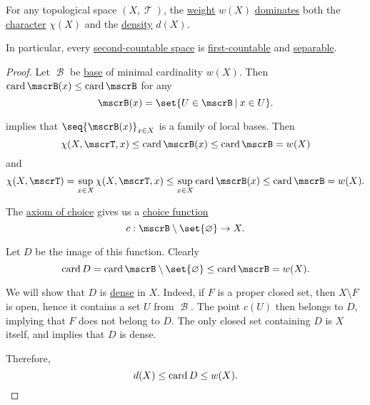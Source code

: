 \begin{proposition}\label{thm:topological_space_countability}
  For any topological space \( (X, \mscrT) \), the \hyperref[def:topological_space_weight]{weight} \( w(X) \) \hyperref[def:equinumerosity]{dominates} both the \hyperref[def:topological_space_character]{character} \( \chi(X) \) and the \hyperref[def:topological_space_density]{density} \( d(X) \).
\end{proposition}
\begin{comments}
  \item In particular, every \hyperref[def:topological_space_weight]{second-countable space} is \hyperref[def:topological_space_character]{first-countable} and \hyperref[def:topological_space_density]{separable}.
\end{comments}
\begin{proof}
   Let \( \mscrB \) be \hyperref[def:topological_base]{base} of minimal cardinality \( w(X) \). Then \( \card \mscrB(x) \leq \card \mscrB \) for any
  \begin{equation*}
    \mscrB(x) = \set{ U \in \mscrB \given x \in U }.
  \end{equation*}

   implies that \( \seq{ \mscrB(x) }_{x \in X} \) is a family of local bases. Then
  \begin{equation*}
    \chi(X, \mscrT, x) \leq \card \mscrB(x) \leq \card \mscrB = w(X)
  \end{equation*}
  and
  \begin{equation*}
    \chi(X, \mscrT) = \sup_{x \in X} \chi(X, \mscrT, x) \leq \sup_{x \in X} \card \mscrB(x) \leq \card \mscrB = w(X).
  \end{equation*}

   The \hyperref[def:zfc/choice]{axiom of choice} gives us a \hyperref[def:choice_function]{choice function}
  \begin{equation*}
    c: \mscrB \setminus \set{ \varnothing } \to X.
  \end{equation*}

  Let \( D \) be the image of this function. Clearly
  \begin{equation*}
    \card D = \card \mscrB \setminus \set{ \varnothing } \leq \card \mscrB = w(X).
  \end{equation*}

  We will show that \( D \) is \hyperref[def:topologically_dense_set]{dense} in \( X \). Indeed, if \( F \) is a proper closed set, then \( X \setminus F \) is open, hence it contains a set \( U \) from \( \mscrB \). The point \( c(U) \) then belongs to \( D \), implying that \( F \) does not belong to \( D \). The only closed set containing \( D \) is \( X \) itself, and  implies that \( D \) is dense.

  Therefore,
  \begin{equation*}
    d(X) \leq \operatorname{card} D \leq w(X).
  \end{equation*}
\end{proof}

